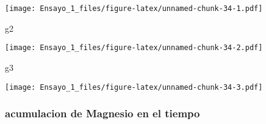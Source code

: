 \documentclass[
]{article}
\newenvironment{Shaded}{\begin{snugshade}}{\end{snugshade}}
\newcommand{\ConstantTok}[1]{\textcolor[rgb]{0.00,0.00,0.00}{#1}}
\newcommand{\FunctionTok}[1]{\textcolor[rgb]{0.00,0.00,0.00}{#1}}
\newcommand{\NormalTok}[1]{#1}
\newcommand{\OtherTok}[1]{\textcolor[rgb]{0.56,0.35,0.01}{#1}}
\newcommand{\SpecialCharTok}[1]{\textcolor[rgb]{0.00,0.00,0.00}{#1}}
\begin{document}
\texttt{[image: Ensayo\_1\_files/figure-latex/unnamed-chunk-34-1.pdf]}

\begin{Shaded}
\begin{Highlighting}[]
\NormalTok{g2}
\end{Highlighting}
\end{Shaded}

\texttt{[image: Ensayo\_1\_files/figure-latex/unnamed-chunk-34-2.pdf]}

\begin{Shaded}
\begin{Highlighting}[]
\NormalTok{g3}
\end{Highlighting}
\end{Shaded}

\texttt{[image: Ensayo\_1\_files/figure-latex/unnamed-chunk-34-3.pdf]}

\hypertarget{acumulacion-de-magnesio-en-el-tiempo}{%
\subsubsection{acumulacion de Magnesio en el
tiempo}\label{acumulacion-de-magnesio-en-el-tiempo}}

\begin{Shaded}
\end{Shaded}
\end{document}

